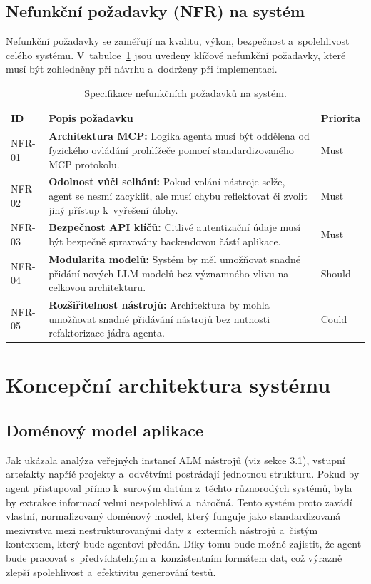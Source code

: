 \documentclass[czech, ing, kiv, he, iso690numb, viewonly]{fasthesis}
\begin{document}
\subsection{Nefunkční požadavky (NFR) na systém}
Nefunkční požadavky se zaměřují na kvalitu, výkon, bezpečnost a~spolehlivost celého systému.
V~tabulce~\ref{tab:nonfunctional_req} jsou uvedeny klíčové nefunkční požadavky, které musí být zohledněny při návrhu a~dodrženy 
při implementaci.

\begin{table}[H]
\centering
\begin{tabular}{|l|p{8cm}|l|}
\hline
\textbf{ID} & \textbf{Popis požadavku} & \textbf{Priorita} \\ \hline
NFR-01 & \textbf{Architektura MCP:} Logika agenta musí být oddělena od fyzického ovládání prohlížeče pomocí standardizovaného MCP protokolu. & Must \\ \hline
NFR-02 & \textbf{Odolnost vůči selhání:} Pokud volání nástroje selže, agent se nesmí zacyklit, ale musí chybu reflektovat či zvolit jiný přístup k~vyřešení úlohy. & Must \\ \hline
NFR-03 & \textbf{Bezpečnost API klíčů:} Citlivé autentizační údaje musí být bezpečně spravovány backendovou částí aplikace. & Must \\ \hline
NFR-04 & \textbf{Modularita modelů:} Systém by měl umožňovat snadné přidání nových LLM modelů bez významného vlivu na celkovou architekturu. & Should \\ \hline
NFR-05 & \textbf{Rozšiřitelnost nástrojů:} Architektura by mohla umožňovat snadné přidávání nástrojů bez nutnosti refaktorizace jádra agenta. & Could \\ \hline
\end{tabular}
\caption{Specifikace nefunkčních požadavků na systém.}
\label{tab:nonfunctional_req}
\end{table}

\section{Koncepční architektura systému}
\subsection{Doménový model aplikace}
Jak ukázala analýza veřejných instancí ALM nástrojů (viz sekce 3.1), vstupní artefakty napříč projekty a~odvětvími postrádají jednotnou strukturu.
Pokud by agent přistupoval přímo k~surovým datům z~těchto různorodých systémů, byla by extrakce informací velmi nespolehlivá a~náročná.
Tento systém proto zavádí vlastní, normalizovaný doménový model, který funguje jako standardizovaná mezivrstva mezi nestrukturovanými daty z~externích nástrojů a~čistým kontextem,
který bude agentovi předán. Díky tomu bude možné zajistit, že agent bude pracovat s~předvídatelným a~konzistentním formátem dat, což výrazně zlepší spolehlivost a~efektivitu generování testů.
\end{document}
